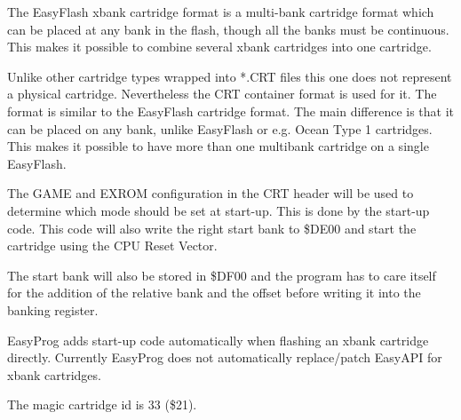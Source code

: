 \documentclass[a4paper,oneside]{memoir}
\begin{document}
The EasyFlash xbank cartridge format is a multi-bank cartridge format which can
be placed at any bank in the flash, though all the banks must be continuous.
This makes it possible to combine several xbank cartridges into one cartridge.

Unlike other cartridge types wrapped into *.CRT files this one does not
represent a physical cartridge. Nevertheless the CRT container format is used
for it. The format is similar to the EasyFlash cartridge format. The main
difference is that it can be placed on any bank, unlike EasyFlash or e.g. Ocean
Type 1 cartridges. This makes it possible to have more than one multibank
cartridge on a single EasyFlash.

The GAME and EXROM configuration in the CRT header will be used to determine
which mode should be set at start-up. This is done by the start-up code. This
code will also write the right start bank to \$DE00 and start the cartridge
using the CPU Reset Vector.

The start bank will also be stored in \$DF00 and the program has to care itself
for the addition of the relative bank and the offset before writing it into the
banking register.

EasyProg adds start-up code automatically when flashing an xbank cartridge
directly. Currently EasyProg does not automatically replace/patch EasyAPI for
xbank cartridges.

The magic cartridge id is 33 (\$21).
\end{document}

